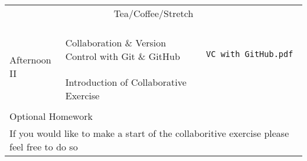 \documentclass{article}[12pt]
\begin{document}
\begin{table}[h!]
\begin{tabular}{ |p{2cm}|p{5cm}|p{6cm}| }
\multicolumn{3}{c}{Tea/Coffee/Stretch}  \\ 
\multicolumn{3}{c}{} \\ \hline
                               &                              & \\
\multirow{3}{*}{Afternoon II}  & Collaboration \& Version Control with Git \& GitHub & \begin{verbatim} VC_with_GitHub.pdf \end{verbatim} \\
                               &                              &  \\
                               & Introduction of Collaborative Exercise &  \\ \hline \hline
\multicolumn{3}{l}{} \\
\multicolumn{3}{l}{Optional Homework} \\
\multicolumn{3}{l}{If you would like to make a start of the collaboritive exercise please feel free to do so}
\end{tabular}
\end{table}

\clearpage
\end{document}

